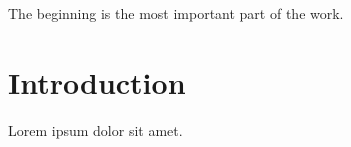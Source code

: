 



\begin{savequote}[50mm]
The beginning is the most important part of the work. 
\end{savequote}

\chapter{Introduction}
\label{cha:Introduction}

\ifpdf
    \graphicspath{{1_introduction/figures/PNG/}{1_introduction/figures/PDF/}{1_introduction/figures/}}
\else
    \graphicspath{{1_introduction/figures/EPS/}{1_introduction/figures/}}
\fi




Lorem ipsum dolor sit amet.



